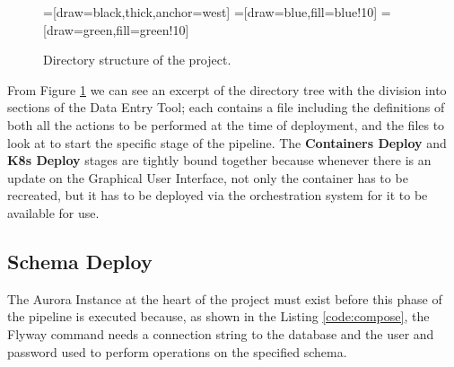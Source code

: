 \begin{figure}[!htb]
  \centering
  =[draw=black,thick,anchor=west]
  =[draw=blue,fill=blue!10]
  =[draw=green,fill=green!10]
  \caption{Directory structure of the project.}
  \label{fig:directoryTree}
\end{figure}

From Figure \ref{fig:directoryTree} we can see an excerpt of the directory tree with the division into sections of the Data Entry Tool; each contains a file  including the definitions of both all the actions to be performed at the time of deployment, and the files to look at to start the specific stage of the pipeline. The \textbf{Containers Deploy} and \textbf{K8s Deploy} stages are tightly bound together because whenever there is an update on the Graphical User Interface, not only the container has to be recreated, but it has to be deployed via the orchestration system for it to be available for use.

\subsection{Schema Deploy}
The Aurora Instance at the heart of the project must exist before this phase of the pipeline is executed because, as shown in the Listing \ref{code:compose}, the Flyway command  needs a connection string to the database and the user and password used to perform operations on the specified schema.


